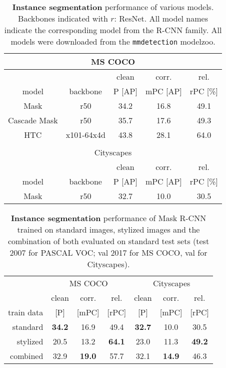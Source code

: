 \documentclass{article}
\begin{document}
\begin{table}[t!]
\begin{center}
\begin{tabular}{c|c|ccc}
\multicolumn{5}{c}{MS COCO} \\
\toprule
\multicolumn{2}{c}{} & clean & corr. & rel.\\
model & backbone & P \small{[AP]} & mPC \small{[AP]} & rPC \small{[\%]}\\
\hline
Mask & r50 & 34.2 & 16.8 & 49.1\\
Cascade Mask & r50 & 35.7 & 17.6 & 49.3\\
HTC & x101-64x4d & 43.8 & 28.1 & 64.0\\
\bottomrule


\multicolumn{5}{c}{} \\
\multicolumn{5}{c}{Cityscapes} \\
\toprule
\multicolumn{2}{c}{} & clean & corr. & rel.\\
model & backbone & P \small{[AP]} & mPC \small{[AP]} & rPC \small{[\%]}\\
\hline
Mask & r50 & 32.7 & 10.0 & 30.5\\
\bottomrule
\end{tabular}
\caption{\textbf{Instance segmentation} performance of various models. Backbones indicated with $r$: ResNet. All model names indicate the corresponding model from the R-CNN family. All models were downloaded from the \texttt{mmdetection} modelzoo.}
\label{table:results_instance_segmentation}
\end{center}
\end{table}

\begin{table}[t!]
\begin{center}
\begin{tabular}{r|ccc|ccc}
\toprule
 & \multicolumn{3}{c|}{MS COCO} & \multicolumn{3}{c}{Cityscapes} \\
& clean & corr. & rel. & clean & corr. & rel. \\
train data & \small{[P]} & \small{[mPC]} & \small{[rPC]} & \small{[P]} & \small{[mPC]} & \small{[rPC]} \\
\hline
standard & \textbf{34.2} & 16.9 & 49.4 & \textbf{32.7} & 10.0 & 30.5\\
\hline
stylized & 20.5 & 13.2 & \textbf{64.1} & 23.0 & 11.3 & \textbf{49.2}\\
combined & 32.9 & \textbf{19.0} & 57.7 & 32.1 & \textbf{14.9} & 46.3\\
\bottomrule
\end{tabular}
\caption{\textbf{Instance segmentation} performance of Mask R-CNN trained on standard images, stylized images and the combination of both evaluated on standard test sets (test 2007 for PASCAL VOC; val 2017 for MS COCO, val for Cityscapes).}
\label{table:results_stylized_instance_segmentation}
\end{center}
\end{table}
\end{document}
